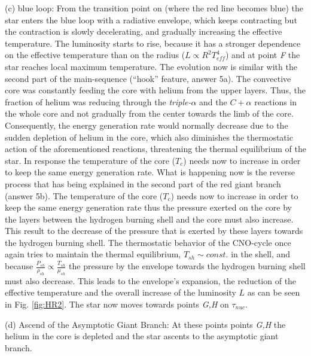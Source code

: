 \documentclass{article}
\begin{document}
\begin{enumerate}
    (c) blue loop: From the transition point on (where the red line becomes blue)  the star enters the blue loop with a radiative envelope, which keeps contracting but the contraction is slowly decelerating, and gradually increasing the effective temperature. The luminosity starts to rise, because it has a stronger dependence on the effective temperature than on the radius ($L \propto R^2 T_{eff}^4$) and at point {\it F} the star reaches local maximum temperature. The evolution now is similar with the second part of  the main-sequence (``hook'' feature, answer 5a). The convective core was constantly feeding the core with helium from the upper layers. Thus, the fraction of helium was reducing through the {\it triple-$\alpha$} and the $C+\alpha$ reactions in the whole core and not gradually from the center towards the limb of the core. Consequently, the energy generation rate would normally decrease due to the sudden depletion of helium in the core, which also diminishes the thermostatic action of the aforementioned reactions, threatening the thermal equilibrium of the star. In response the temperature of the core ($T_c$) needs now to increase in order to keep the same energy generation rate. What is happening now is the reverse process that has being explained in the second part of the red giant branch (answer 5b). The temperature of the core ($T_c$) needs now to increase in order to keep the same energy generation rate thus the pressure exerted on the core by the layers between the hydrogen burning shell and the core must also increase. This result to the decrease of the pressure that is exerted by these layers towards the hydrogen burning shell. The thermostatic behavior of the CNO-cycle once again tries to maintain the thermal equilibrium, $T_{sh} \sim const.$ in the shell, and because $\frac{P_{sh}}{\rho_{sh}} \propto \frac{T_{sh}}{\mu_{sh}}$ the pressure by the envelope towards the hydrogen burning shell must also decrease. This leads to the envelope's expansion, the reduction of the effective temperature and the overall increase of the luminosity $L$ as can be seen in Fig. \ref{fig:HR2}. The star now moves towards points {\it G,H} on $\tau_{nuc}$. 
    
    (d) Ascend of the Asymptotic Giant Branch: At these points  points {\it G,H} the helium in the core is depleted and the star ascents to the asymptotic giant branch.
    

\end{enumerate}
\end{document}
